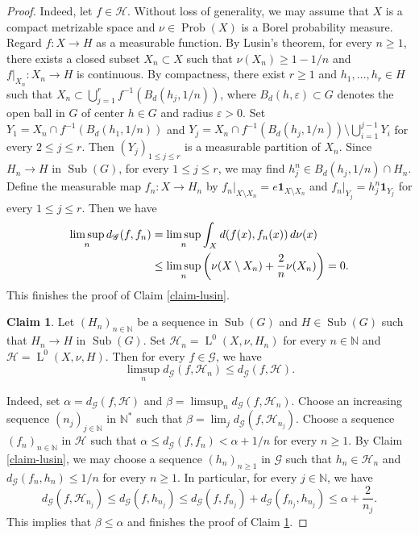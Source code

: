 \documentclass[11pt]{amsart}
\numberwithin{equation}{section}
\theoremstyle{plain}
\theoremstyle{definition}
\newtheorem{claim}[thm]{Claim}
\newcommand{\N}{\mathbb{N}}
\newcommand{\Prob}{\operatorname{Prob}}
\newcommand{\Sub}{\operatorname{Sub}}
\newcommand{\rL}{\operatorname{L}}
\begin{document}
\begin{proof}
Indeed, let $f \in \mathscr H$. Without loss of generality, we may assume that $X$ is a compact metrizable space and $\nu \in \Prob(X)$ is a Borel probability measure. Regard $f : X \to H$ as a measurable function. By Lusin's theorem, for every $n \geq 1$, there exists a closed subset $X_n \subset X$ such that $\nu(X_n) \geq 1 - 1/n$ and $f|_{X_n} : X_n \to H$ is continuous. By compactness, there exist $r \geq 1$ and $h_1, \dots, h_r \in H$ such that $X_n \subset \bigcup_{j = 1}^r f^{-1}(B_{d}(h_j, 1/n))$, where $B_d(h, \varepsilon) \subset G$ denotes the open ball in $G$ of center $h \in G$ and radius $\varepsilon > 0$. Set $Y_1 = X_n \cap f^{-1}(B_{d}(h_1, 1/n))$ and $Y_j = X_n \cap f^{-1}(B_{d}(h_j, 1/n)) \setminus \bigcup_{i = 1}^{j - 1} Y_i$ for every $2 \leq j \leq r$. Then $(Y_j)_{1 \leq j \leq r}$ is a measurable partition of $X_n$. Since $H_n \to H$ in $\Sub(G)$, for every $1 \leq j \leq r$, we may find $h_j^n \in B_{d}(h_j, 1/n) \cap H_n$. Define the measurable map $f_n : X \to H_n$ by $f_n|_{X \setminus X_n} = e \mathbf 1_{X \setminus X_n}$ and $f_n|_{Y_j} = h_j^n \mathbf 1_{Y_j}$ for every $1 \leq j \leq r$. Then we have
\begin{align*}
\limsup_n d_{\mathscr G}(f, f_n) &= \limsup_n \int_X d(f(x), f_n(x)) \,{\rm d}\nu(x) \\
&\leq \limsup_n \left(\nu(X \setminus X_n) + \frac2n \nu(X_n) \right) =0.
\end{align*}
This finishes the proof of Claim \ref{claim-lusin}.

\begin{claim}\label{claim-closed}
Let $(H_n)_{n \in \N}$ be a sequence in $\Sub(G)$ and $H \in \Sub(G)$ such that $H_n \to H$ in $\Sub(G)$. Set $\mathscr H_n = \rL^0(X, \nu, H_n)$ for every $n \in \N$ and $\mathscr H = \rL^0(X, \nu, H)$. Then for every $f \in \mathscr G$, we have
$$\limsup_n d_{\mathscr G}(f, \mathscr H_n) \leq d_{\mathscr G}(f, \mathscr H).$$
\end{claim}

Indeed, set $\alpha = d_{\mathscr G}(f, \mathscr H)$ and $\beta = \limsup_n d_{\mathscr G}(f, \mathscr H_n)$. Choose an increasing sequence $(n_j)_{j \in \N}$ in $\N^*$ such that $\beta = \lim_j d_{\mathscr G}(f, \mathscr H_{n_j})$. Choose a sequence $(f_n)_{n \in \N}$ in $\mathscr H$ such that $\alpha \leq d_{\mathscr G}(f, f_n) < \alpha + 1/n$ for every $n \geq 1$. By Claim \ref{claim-lusin}, we may choose a sequence $(h_n)_{n \geq 1}$ in $\mathscr G$ such that $h_n \in \mathscr H_n$ and $d_{\mathscr G}(f_n, h_n) \leq 1/n$ for every $n \geq 1$. In particular, for every $j \in \N$, we have 
$$d_{\mathscr G}(f, \mathscr H_{n_j}) \leq d_{\mathscr G}(f, h_{n_j}) \leq d_{\mathscr G}(f, f_{n_j}) + d_{\mathscr G}(f_{n_j}, h_{n_j}) \leq \alpha + \frac{2}{n_j}.$$
This implies that $\beta \leq \alpha$ and finishes the proof of Claim \ref{claim-closed}.


\end{proof}
\end{document}
